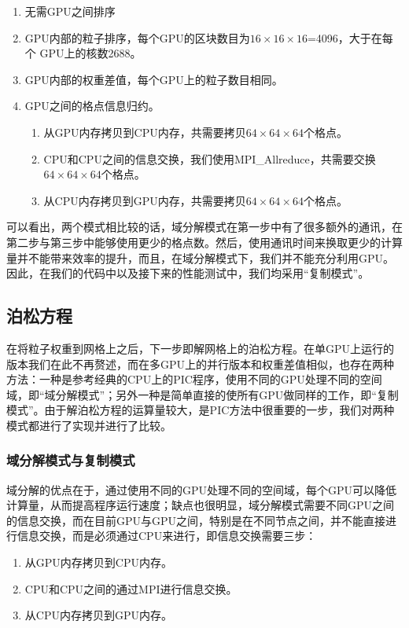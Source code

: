 \begin{enumerate}
  \item 无需GPU之间排序
  \item GPU内部的粒子排序，每个GPU的区块数目为$16 \times 16 \times 16$=4096，大于在每个 GPU上的核数2688。
  \item GPU内部的权重差值，每个GPU上的粒子数目相同。
  \item GPU之间的格点信息归约。
  \begin{enumerate}
    \item 从GPU内存拷贝到CPU内存，共需要拷贝$64 \times 64 \times 64$个格点。
    \item CPU和CPU之间的信息交换，我们使用MPI\_Allreduce，共需要交换 $64 \times 64 \times 64$个格点。
    \item 从CPU内存拷贝到GPU内存，共需要拷贝$64 \times 64 \times 64$个格点。
  \end{enumerate}
\end{enumerate}

可以看出，两个模式相比较的话，域分解模式在第一步中有了很多额外的通讯，在第二步与第三步中能够使用更少的格点数。然后，使用通讯时间来换取更少的计算量并不能带来效率的提升，而且，在域分解模式下，我们并不能充分利用GPU。因此，在我们的代码中以及接下来的性能测试中，我们均采用“复制模式”。

\subsection{泊松方程}
\label{section:PIC_GPU_Poisson}
在将粒子权重到网格上之后，下一步即解网格上的泊松方程。在单GPU上运行的版本我们在此不再赘述，而在多GPU上的并行版本和权重差值相似，也存在两种方法：一种是参考经典的CPU上的PIC程序，使用不同的GPU处理不同的空间域，即“域分解模式”；另外一种是简单直接的使所有GPU做同样的工作，即“复制模式”。由于解泊松方程的运算量较大，是PIC方法中很重要的一步，我们对两种模式都进行了实现并进行了比较。

\subsubsection{域分解模式与复制模式}
域分解的优点在于，通过使用不同的GPU处理不同的空间域，每个GPU可以降低计算量，从而提高程序运行速度；缺点也很明显，域分解模式需要不同GPU之间的信息交换，而在目前GPU与GPU之间，特别是在不同节点之间，并不能直接进行信息交换，而是必须通过CPU来进行，即信息交换需要三步：
\begin{enumerate}
  \item 从GPU内存拷贝到CPU内存。
  \item CPU和CPU之间的通过MPI进行信息交换。
  \item 从CPU内存拷贝到GPU内存。
\end{enumerate}

